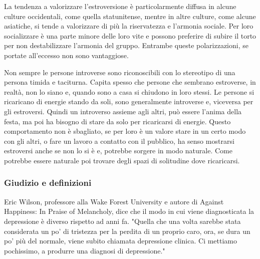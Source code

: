 \documentclass[12pt]{book} %
\begin{document}
\begin{mdframed}[linewidth=1pt]
La tendenza a valorizzare l’estroversione è particolarmente diffusa in alcune culture occidentali, come quella statunitense, mentre in altre culture, come alcune asiatiche, si tende a valorizzare di più la riservatezza e l’armonia sociale. Per loro socializzare è una parte
minore delle loro vite e possono preferire di subire il torto per non destabilizzare l'armonia del gruppo. Entrambe queste
polarizzazioni, se portate all'eccesso non sono vantaggiose.

Non sempre le persone introverse sono riconoscibili con lo stereotipo di una persona timida e taciturna. Capita spesso
che persone che sembrano estroverse, in realtà, non lo siano e, quando sono a casa si chiudono in loro stessi. 
Le persone si ricaricano di energie stando da soli, sono generalmente introverse e, viceversa per gli estroversi. Quindi un introverso assieme agli altri,
può essere l'anima della festa, ma poi ha bisogno di stare da solo per ricaricarsi di energie. Questo
comportamento non è sbagliato, se per loro è un valore stare in un certo modo con gli altri, o fare un lavoro a contatto
con il pubblico, ha senso mostrarsi estroversi anche se non lo si è e, potrebbe sorgere in modo naturale. Come potrebbe essere naturale poi trovare
degli spazi di solitudine dove ricaricarsi.
\end{mdframed}

\subsubsection{Giudizio e definizioni}
Eric Wilson, professore alla Wake Forest University e autore di Against Happiness: In Praise of Melancholy, dice che il
modo in cui viene diagnosticata la depressione è diverso rispetto ad anni fa. "Quella che una volta
sarebbe stata considerata un po' di tristezza per la perdita di un proprio caro, ora, se dura un po' più del normale,
viene subito chiamata depressione clinica. Ci mettiamo pochissimo, a produrre una diagnosi di
depressione."
\end{document}
